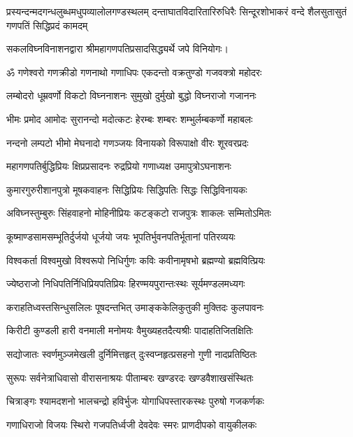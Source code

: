 {प्रस्यन्दन्मदगन्धलुब्धमधुपव्यालोलगण्डस्थलम्}
{दन्ताघातविदारितारिरुधिरैः सिन्दूरशोभाकरं}
{वन्दे शैलसुतासुतं गणपतिं सिद्धिप्रदं कामदम्}

सकलविघ्नविनाशनद्वारा श्रीमहागणपतिप्रसादसिद्ध्यर्थे जपे विनियोगः।



\resetShloka
\twolineshloka
{ॐ गणेश्वरो गणक्रीडो गणनाथो गणाधिपः}
{एकदन्तो वक्रतुण्डो गजवक्त्रो महोदरः}%

\twolineshloka
{लम्बोदरो धूम्रवर्णो विकटो विघ्ननाशनः}
{सुमुखो दुर्मुखो बुद्धो विघ्नराजो गजाननः}%

\twolineshloka
{भीमः प्रमोद आमोदः सुरानन्दो मदोत्कटः}
{हेरम्बः शम्बरः शम्भुर्लम्बकर्णो महाबलः}%

\twolineshloka
{नन्दनो लम्पटो भीमो मेघनादो गणञ्जयः}
{विनायको विरूपाक्षो वीरः शूरवरप्रदः}%

\twolineshloka
{महागणपतिर्बुद्धिप्रियः क्षिप्रप्रसादनः}
{रुद्रप्रियो गणाध्यक्ष उमापुत्रोऽघनाशनः}%

\twolineshloka
{कुमारगुरुरीशानपुत्रो मूषकवाहनः}
{सिद्धिप्रियः सिद्धिपतिः सिद्धः सिद्धिविनायकः}%

\twolineshloka
{अविघ्नस्तुम्बुरुः सिंहवाहनो मोहिनीप्रियः}
{कटङ्कटो राजपुत्रः शाकलः सम्मितोऽमितः}%

\twolineshloka
{कूष्माण्डसामसम्भूतिर्दुर्जयो धूर्जयो जयः}
{भूपतिर्भुवनपतिर्भूतानां पतिरव्ययः}%

\twolineshloka
{विश्वकर्ता विश्वमुखो विश्वरूपो निधिर्गुणः}
{कविः कवीनामृषभो ब्रह्मण्यो ब्रह्मवित्प्रियः}%

\twolineshloka
{ज्येष्ठराजो निधिपतिर्निधिप्रियपतिप्रियः}
{हिरण्मयपुरान्तःस्थः सूर्यमण्डलमध्यगः}%

\twolineshloka
{कराहतिध्वस्तसिन्धुसलिलः पूषदन्तभित्}
{उमाङ्ककेलिकुतुकी मुक्तिदः कुलपावनः}%

\twolineshloka
{किरीटी कुण्डली हारी वनमाली मनोमयः}
{वैमुख्यहतदैत्यश्रीः पादाहतिजितक्षितिः}%

\twolineshloka
{सद्योजातः स्वर्णमुञ्जमेखली दुर्निमित्तहृत्}
{दुःस्वप्नहृत्प्रसहनो गुणी नादप्रतिष्ठितः}%

\twolineshloka
{सुरूपः सर्वनेत्राधिवासो वीरासनाश्रयः}
{पीताम्बरः खण्डरदः खण्डवैशाखसंस्थितः}%

\twolineshloka
{चित्राङ्गः श्यामदशनो भालचन्द्रो हविर्भुजः}
{योगाधिपस्तारकस्थः पुरुषो गजकर्णकः}%

\twolineshloka
{गणाधिराजो विजयः स्थिरो गजपतिर्ध्वजी}
{देवदेवः स्मरः प्राणदीपको वायुकीलकः}%

